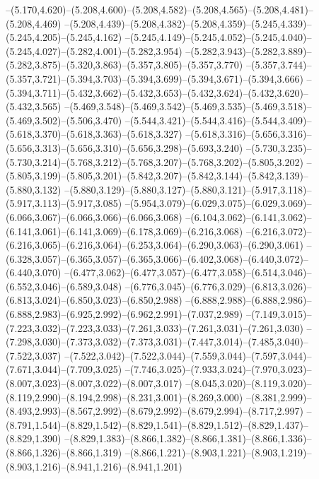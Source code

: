   --(5.170,4.620)--(5.208,4.600)--(5.208,4.582)--(5.208,4.565)--(5.208,4.481)--(5.208,4.469)%
  --(5.208,4.439)--(5.208,4.382)--(5.208,4.359)--(5.245,4.339)--(5.245,4.205)--(5.245,4.162)%
  --(5.245,4.149)--(5.245,4.052)--(5.245,4.040)--(5.245,4.027)--(5.282,4.001)--(5.282,3.954)%
  --(5.282,3.943)--(5.282,3.889)--(5.282,3.875)--(5.320,3.863)--(5.357,3.805)--(5.357,3.770)%
  --(5.357,3.744)--(5.357,3.721)--(5.394,3.703)--(5.394,3.699)--(5.394,3.671)--(5.394,3.666)%
  --(5.394,3.711)--(5.432,3.662)--(5.432,3.653)--(5.432,3.624)--(5.432,3.620)--(5.432,3.565)%
  --(5.469,3.548)--(5.469,3.542)--(5.469,3.535)--(5.469,3.518)--(5.469,3.502)--(5.506,3.470)%
  --(5.544,3.421)--(5.544,3.416)--(5.544,3.409)--(5.618,3.370)--(5.618,3.363)--(5.618,3.327)%
  --(5.618,3.316)--(5.656,3.316)--(5.656,3.313)--(5.656,3.310)--(5.656,3.298)--(5.693,3.240)%
  --(5.730,3.235)--(5.730,3.214)--(5.768,3.212)--(5.768,3.207)--(5.768,3.202)--(5.805,3.202)%
  --(5.805,3.199)--(5.805,3.201)--(5.842,3.207)--(5.842,3.144)--(5.842,3.139)--(5.880,3.132)%
  --(5.880,3.129)--(5.880,3.127)--(5.880,3.121)--(5.917,3.118)--(5.917,3.113)--(5.917,3.085)%
  --(5.954,3.079)--(6.029,3.075)--(6.029,3.069)--(6.066,3.067)--(6.066,3.066)--(6.066,3.068)%
  --(6.104,3.062)--(6.141,3.062)--(6.141,3.061)--(6.141,3.069)--(6.178,3.069)--(6.216,3.068)%
  --(6.216,3.072)--(6.216,3.065)--(6.216,3.064)--(6.253,3.064)--(6.290,3.063)--(6.290,3.061)%
  --(6.328,3.057)--(6.365,3.057)--(6.365,3.066)--(6.402,3.068)--(6.440,3.072)--(6.440,3.070)%
  --(6.477,3.062)--(6.477,3.057)--(6.477,3.058)--(6.514,3.046)--(6.552,3.046)--(6.589,3.048)%
  --(6.776,3.045)--(6.776,3.029)--(6.813,3.026)--(6.813,3.024)--(6.850,3.023)--(6.850,2.988)%
  --(6.888,2.988)--(6.888,2.986)--(6.888,2.983)--(6.925,2.992)--(6.962,2.991)--(7.037,2.989)%
  --(7.149,3.015)--(7.223,3.032)--(7.223,3.033)--(7.261,3.033)--(7.261,3.031)--(7.261,3.030)%
  --(7.298,3.030)--(7.373,3.032)--(7.373,3.031)--(7.447,3.014)--(7.485,3.040)--(7.522,3.037)%
  --(7.522,3.042)--(7.522,3.044)--(7.559,3.044)--(7.597,3.044)--(7.671,3.044)--(7.709,3.025)%
  --(7.746,3.025)--(7.933,3.024)--(7.970,3.023)--(8.007,3.023)--(8.007,3.022)--(8.007,3.017)%
  --(8.045,3.020)--(8.119,3.020)--(8.119,2.990)--(8.194,2.998)--(8.231,3.001)--(8.269,3.000)%
  --(8.381,2.999)--(8.493,2.993)--(8.567,2.992)--(8.679,2.992)--(8.679,2.994)--(8.717,2.997)%
  --(8.791,1.544)--(8.829,1.542)--(8.829,1.541)--(8.829,1.512)--(8.829,1.437)--(8.829,1.390)%
  --(8.829,1.383)--(8.866,1.382)--(8.866,1.381)--(8.866,1.336)--(8.866,1.326)--(8.866,1.319)%
  --(8.866,1.221)--(8.903,1.221)--(8.903,1.219)--(8.903,1.216)--(8.941,1.216)--(8.941,1.201)%
